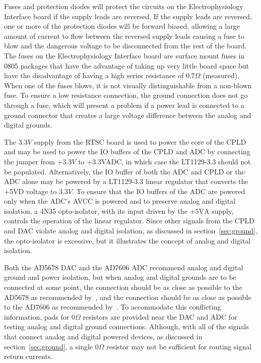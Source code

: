 Fuses and protection diodes will protect the circuits on the Electrophysiology Interface board if the supply leads are reversed.  If the supply leads are reversed, one or more of the protection diodes will be forward biased, allowing a large amount of current to flow between the reversed supply leads causing a fuse to blow and the dangerous voltage to be disconnected from the rest of the board.  The fuses on the Electrophysiology Interface board are surface mount fuses in 0805 packages that have the advantage of taking up very little board space but have the disadvantage of having a high series resistance of $0.7\unit{\Omega}$ (measured).  When one of the fuses blows, it is not visually distinguishable from a non-blown fuse.  To ensure a low resistance connection, the ground connection does not go through a fuse, which will present a problem if a power lead is connected to a ground connector that creates a large voltage difference between the analog and digital grounds.

The $3.3\unit{V}$ supply from the RTSC board is used to power the core of the CPLD and may be used to power the IO buffers of the CPLD and ADC by connecting the jumper from $+3.3\unit{V}$ to +3.3VADC, in which case the LT1129-3.3 should not be populated.  Alternatively, the IO buffer of both the ADC and CPLD or the ADC alone may be powered by a LT1129-3.3 linear regulator that converts the +5VD voltage to $3.3\unit{V}$.  To ensure that the IO buffers of the ADC are powered only when the ADC's AVCC is powered and to preserve analog and digital isolation, a 4N35 opto-isolator, with its input driven by the $+5\mathrm{VA}$ supply, controls the operation of the linear regulator.  Since other signals from the CPLD and DAC violate analog and digital isolation, as discussed in section~\ref{sec:ground}, the opto-isolator is excessive, but it illustrates the concept of analog and digital isolation.

Both the AD5678 DAC and the AD7606 ADC recommend analog and digital ground and power isolation, but when analog and digital grounds are to be connected at some point, the connection should be as close as possible to the AD5678 as recommended by~\cite{AD5678ds}, and the connection should be as close as possible to the AD7606 as recommended by~\cite{AD7606ds}.  To accommodate this conflicting information, pads for $0\unit{\Omega}$ resistors are provided near the DAC and ADC for testing analog and digital ground connections.  Although, with all of the signals that connect analog and digital powered devices, as discussed in section~\ref{sec:ground}, a single $0\unit{\Omega}$ resistor may not be sufficient for routing signal return currents.

